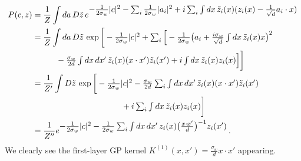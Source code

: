 \documentclass[11pt]{article}
\begin{document}
\begin{align}
    P(c,z) &= \frac{1}{Z} \int da\,D\tilde z\, e^{\textstyle -\frac{1}{2\sigma_w}|c|^2-\sum_i \frac{1}{2\sigma_w} |a_i|^2 + i \sum_i \int dx\, \tilde z_i(x)(z_i(x)-\frac{1}{\sqrt d}a_i\cdot x)} \\
     &= \frac{1}{Z} \int da\,D\tilde z\, \exp\bigg[\textstyle -\frac{1}{2\sigma_w}|c|^2+\sum_i\Big[- \frac{1}{2\sigma_w} \big(a_i+\frac{i\sigma_w}{\sqrt d}\int dx\,\tilde z_i(x) x\big)^2 \notag \\
     & \hspace{.4in} \textstyle-\frac{\sigma_w}{2d}\int dx\,dx'\, \tilde z_i(x) (x\cdot x') \tilde z_i(x') + i  \int dx\, \tilde z_i(x)z_i(x)\Big]\bigg] \\
     & = \frac{1}{Z'} \int D\tilde z\,\exp\bigg[\textstyle -\frac{1}{2\sigma_w}|c|^2-\frac{\sigma_w}{2d}\sum_i\int dx\,dx'\, \tilde z_i(x) (x\cdot x') \tilde z_i(x') \notag \\
     & \hspace{1.5in} \textstyle + i  \sum_i\int dx\, \tilde z_i(x)z_i(x)\bigg] \\
     & = \frac{1}{Z''} e^{\textstyle  -\frac{1}{2\sigma_w}|c|^2 - \frac{1}{2\sigma_w} \sum_i \int dx\,dx'\, z_i(x) \big(\frac{x\cdot x'}{d}\big)^{-1}z_i(x')}\,.
\end{align}
%
We clearly see the first-layer GP kernel $K^{(1)}(x,x') = \frac{\sigma_w}{d} x\cdot x'$ appearing.
\end{document}
